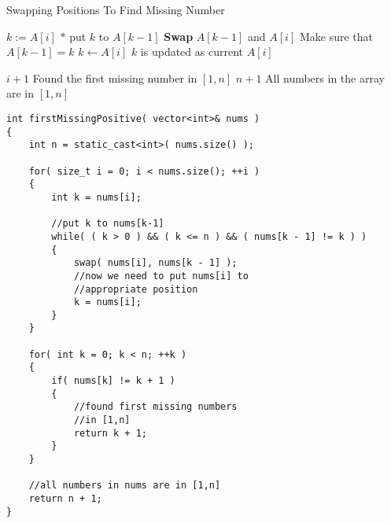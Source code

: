 \setcounter{algorithm}{0}
\begin{algorithm}[H]
\caption{Swapping Positions To Find Missing Number}
\begin{algorithmic}[1]
\State $k:=A[i]$
\State $\ast$ put $k$ to $A[k-1]$
\State \textbf{Swap} $A[k-1]$ and $A[i]$ \Comment Make sure that $A[k-1] = k$
\State $k \gets A[i]$ \Comment $k$ is updated as current $A[i]$
\EndWhile
\EndFor
{}
\end{algorithmic}
\end{algorithm}
\begin{algorithm}[H]
\begin{algorithmic}[1]
\State \Return $i+1$ \Comment Found the first missing number in $[1,n]$
\EndIf
\EndFor
\State \Return $n+1$ \Comment All numbers in the array are in $[1,n]$
\EndProcedure
\end{algorithmic}
\end{algorithm}

\setcounter{lstlisting}{0}
\begin{lstlisting}[style=customc, caption={Swap}]
int firstMissingPositive( vector<int>& nums )
{
    int n = static_cast<int>( nums.size() );

    for( size_t i = 0; i < nums.size(); ++i )
    {
        int k = nums[i];

        //put k to nums[k-1]
        while( ( k > 0 ) && ( k <= n ) && ( nums[k - 1] != k ) )
        {
            swap( nums[i], nums[k - 1] );
            //now we need to put nums[i] to
            //appropriate position
            k = nums[i];
        }
    }

    for( int k = 0; k < n; ++k )
    {
        if( nums[k] != k + 1 )
        {
            //found first missing numbers
            //in [1,n]
            return k + 1;
        }
    }

    //all numbers in nums are in [1,n]
    return n + 1;
}
\end{lstlisting}

